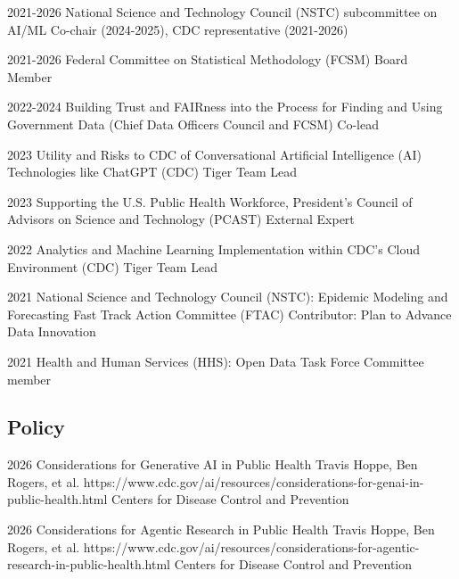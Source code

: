 \documentclass[]{scrartcl}
\begin{document}
\begin{cleanCV}



\WorkExperienceX
{2021-2026}
{National Science and Technology Council (NSTC) subcommittee on AI/ML}
{Co-chair (2024-2025), CDC representative (2021-2026)}

\WorkExperienceX
{2021-2026}
{Federal Committee on Statistical Methodology (FCSM)}
{Board Member}

\WorkExperienceX
{2022-2024}
{Building Trust and FAIRness into the Process for Finding and Using Government Data (Chief Data Officers Council and FCSM)}
{Co-lead}

\WorkExperienceX
{2023}
{Utility and Risks to CDC of Conversational Artificial Intelligence (AI) Technologies like ChatGPT (CDC)}
{Tiger Team Lead}

\WorkExperienceX
{2023}
{Supporting the U.S. Public Health Workforce, President's Council of Advisors on Science and Technology (PCAST)}
{External Expert}

\WorkExperienceX
{2022}
{Analytics and Machine Learning Implementation within CDC's Cloud Environment (CDC)}
{Tiger Team Lead}

\WorkExperienceX
{2021}
{National Science and Technology Council (NSTC): Epidemic Modeling and Forecasting Fast Track Action Committee (FTAC)}
{Contributor: Plan to Advance Data Innovation}

\WorkExperienceX
{2021}
{Health and Human Services (HHS): Open Data Task Force}
{Committee member}



\vspace{-1em}

\subsection{Policy}

\Paper
{2026}
{Considerations for Generative AI in Public Health}
{Travis Hoppe, Ben Rogers, et al.}
{https://www.cdc.gov/ai/resources/considerations-for-genai-in-public-health.html}
{Centers for Disease Control and Prevention}

\Paper
{2026}
{Considerations for Agentic Research in Public Health}
{Travis Hoppe, Ben Rogers, et al.}
{https://www.cdc.gov/ai/resources/considerations-for-agentic-research-in-public-health.html}
{Centers for Disease Control and Prevention}


\end{cleanCV}
\end{document}
